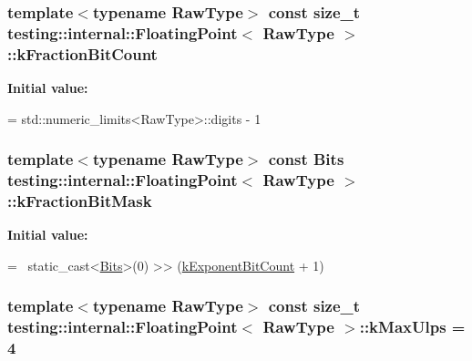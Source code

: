 \hypertarget{classtesting_1_1internal_1_1_floating_point_a0b756a6d2a4f5f5b41ca79651c06c043}{
\subsubsection[{k\+Fraction\+Bit\+Count}]{\setlength{\rightskip}{0pt plus 5cm}template$<$typename Raw\+Type$>$ const size\+\_\+t {\bf testing\+::internal\+::\+Floating\+Point}$<$ Raw\+Type $>$\+::k\+Fraction\+Bit\+Count\hspace{0.3cm}{\ttfamily [static]}}}\label{classtesting_1_1internal_1_1_floating_point_a0b756a6d2a4f5f5b41ca79651c06c043}
{\bfseries Initial value\+:}
\begin{DoxyCode}
=
    std::numeric\_limits<RawType>::digits - 1
\end{DoxyCode}
\hypertarget{classtesting_1_1internal_1_1_floating_point_a0ac75d4ffd24f14bca452abe8a718da1}{
\subsubsection[{k\+Fraction\+Bit\+Mask}]{\setlength{\rightskip}{0pt plus 5cm}template$<$typename Raw\+Type$>$ const {\bf Bits} {\bf testing\+::internal\+::\+Floating\+Point}$<$ Raw\+Type $>$\+::k\+Fraction\+Bit\+Mask\hspace{0.3cm}{\ttfamily [static]}}}\label{classtesting_1_1internal_1_1_floating_point_a0ac75d4ffd24f14bca452abe8a718da1}
{\bfseries Initial value\+:}
\begin{DoxyCode}
=
    ~static\_cast<\hyperlink{classtesting_1_1internal_1_1_floating_point_abf228bf6cd48f12c8b44c85b4971a731}{Bits}>(0) >> (\hyperlink{classtesting_1_1internal_1_1_floating_point_a1973d843c00781053d3073daa8a40119}{kExponentBitCount} + 1)
\end{DoxyCode}
\hypertarget{classtesting_1_1internal_1_1_floating_point_aac498b3714d93f8e88cdc30e4c5935f6}{
\subsubsection[{k\+Max\+Ulps}]{\setlength{\rightskip}{0pt plus 5cm}template$<$typename Raw\+Type$>$ const size\+\_\+t {\bf testing\+::internal\+::\+Floating\+Point}$<$ Raw\+Type $>$\+::k\+Max\+Ulps = 4\hspace{0.3cm}{\ttfamily [static]}}}\label{classtesting_1_1internal_1_1_floating_point_aac498b3714d93f8e88cdc30e4c5935f6}

